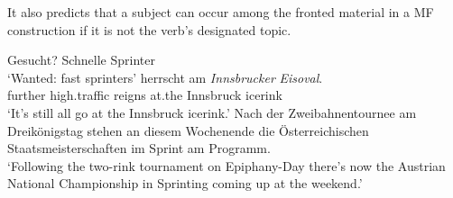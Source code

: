\begin{exe}
\begin{xlist}[iv.]
\begin{exe}
\begin{xlist}[iv.]
%
It also predicts that a subject can occur among the fronted material in a MF construction if it is not the verb's designated topic. %
 

\begin{exe}\exnrfont
\ex\label{eisoval}
\begin{xlist}[iv.]
\ex Gesucht? Schnelle Sprinter\\
    `Wanted: fast sprinters'
\ex
\gll [Weiterhin] [Hochbetrieb] herrscht am \textit{Innsbrucker} \textit{Eisoval}.\\
    \hspaceThis{[}further \hspaceThis{[}high.traffic reigns at.the Innsbruck icerink\\
\glt `It's still all go at the Innsbruck icerink.'\label{eisoval-b}
\ex Nach der Zweibahnentournee am Dreikönigstag stehen an diesem Wochenende die Österreichischen Staatsmeisterschaften im Sprint am Pro\-gramm.\\
 `Following the two-rink tournament on Epiphany-Day there's now the Austrian National Championship in Sprinting coming up at the weekend.' 
\zl



\end{xlist}
\end{exe}
\end{xlist}
\end{exe}
\end{xlist}
\end{exe}
